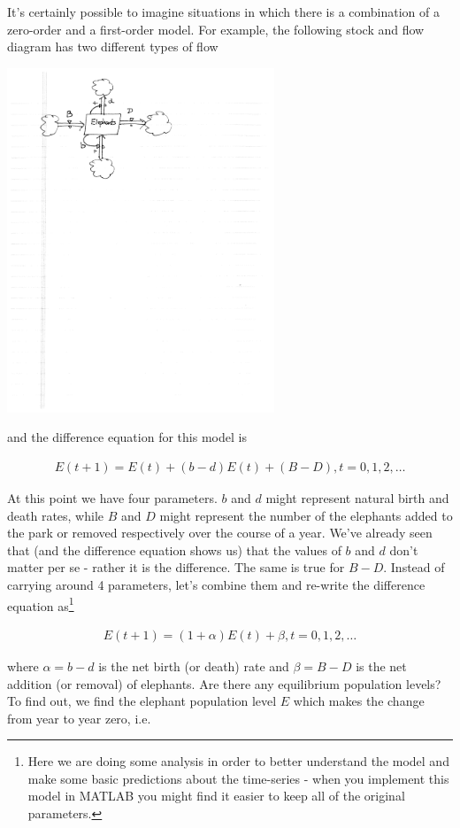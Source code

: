 It's certainly possible to imagine situations in which there is a combination of a zero-order and a first-order model. For example, the following stock and flow diagram has two different types of flow

\centerline{\includegraphics[width=8cm]{figs/combined_model}}

and the difference equation for this model is

\begin{eqnarray*}
E(t+1) = E(t) + (b-d)E(t) + (B-D), t = 0, 1, 2, \ldots
\end{eqnarray*}

At this point we have four parameters. $b$ and $d$ might represent natural birth and death rates, while $B$ and $D$ might represent the number of the elephants added to the park or removed respectively over the course of a year. We've already seen that (and the difference equation shows us) that the values of $b$ and $d$ don't matter per se - rather it is the difference. The same is true for $B-D$. Instead of carrying around 4 parameters, let's combine them and re-write the difference equation as\footnote{Here we are doing some analysis in order to better understand the model and make some basic predictions about the time-series - when you implement this model in MATLAB you might find it easier to keep all of the original parameters.}

\begin{eqnarray*}
E(t+1) = (1+\alpha)E(t) + \beta, t = 0, 1, 2, \ldots
\end{eqnarray*}

where $\alpha = b-d$ is the net birth (or death) rate and $\beta = B-D$ is the net addition (or removal) of elephants. Are there any equilibrium population levels? To find out, we find the elephant population level $E$ which makes the change from year to year zero, i.e.

